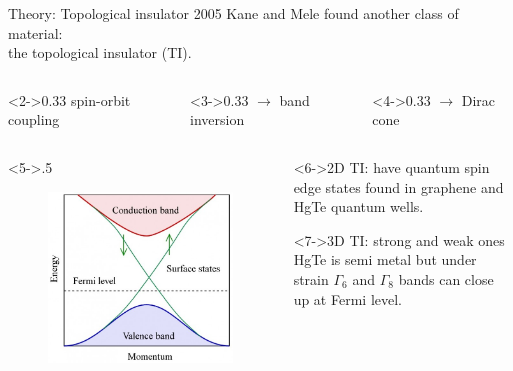 \begin{frame}{Theory: Topological insulator}
	2005 Kane and Mele found another class of material: \\the topological insulator (TI).
	\\
	\begin{columns}
		\begin{column}<2->{0.33\linewidth}
			spin-orbit coupling
		\end{column}
		\hspace{-1cm}
		\begin{column}<3->{0.33\linewidth}
			$\rightarrow$ band inversion
		\end{column}
		\hspace{-1.2cm}
		\begin{column}<4->{0.33\linewidth}
			$\rightarrow$ Dirac cone
		\end{column}
	\end{columns}
	\begin{columns}
		\begin{column}<5->{.5\linewidth}
			\begin{figure}
				\includegraphics[width=\textwidth]{andere_bilder/band_structure_top_insulator}
			\end{figure}
		\end{column}
		\begin{column}{.5\linewidth}
			\begin{block}<6->{2D TI: }
			have quantum spin edge states found in graphene and HgTe quantum wells.
			\end{block}
			\begin{block}<7->{3D TI: }
			strong and weak ones \\
			HgTe is semi metal but under strain $\Gamma_6$ and $\Gamma_8$ bands can close up at Fermi level. 
			\end{block}
		\end{column}
	\end{columns}
	
\end{frame}

